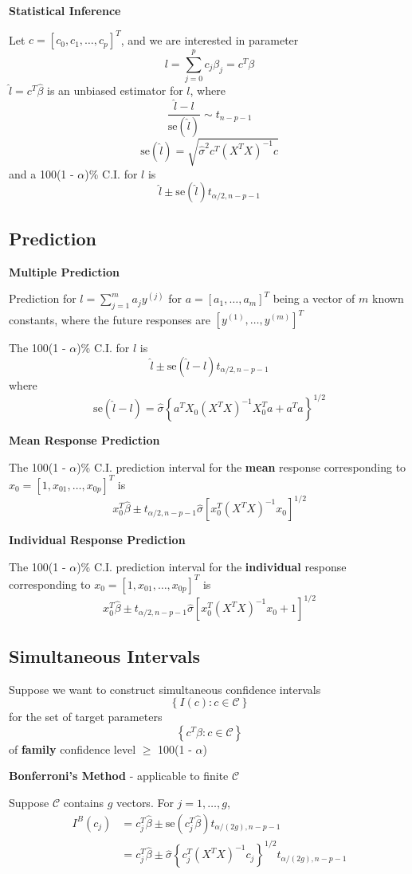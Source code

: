 \documentclass[11pt,a4paper]{article}
\begin{document}
\textbf{Statistical Inference} \par
Let $c = \left[c_0, c_1, \dots, c_p\right]^T$, and we are interested in parameter 
\[
l = \sum_{j=0}^{p} c_j \beta_j = c^T \beta
\]
$\hat{l} = c^T \hat{\beta}$ is an unbiased estimator for $l$, where
\[
\frac{\hat{l} - l}{\text{se}(\hat{l})} \sim t_{n-p-1}
\]
\[
\text{se}(\hat{l}) = \sqrt{\hat{\sigma}^2 c^T (X^TX)^{-1} c}
\]
and a 100(1 - $\alpha$)\% C.I. for $l$ is
\[
\hat{l} \pm \text{se}(\hat{l}) t_{\alpha/2, n-p-1}
\]

\subsection{Prediction}
\textbf{Multiple Prediction} \par
Prediction for $l = \sum_{j=1}^m a_j y^{(j)}$ for $a = \left[a_1, \dots, a_m \right]^T$ being a vector of $m$ known constants, where the future responses are $\left[y^{(1)}, \dots, y^{(m)}\right]^T$ \par
The 100(1 - $\alpha$)\% C.I. for $l$ is
\[
\hat{l} \pm \text{se}(\hat{l} - l) t_{\alpha/2, n-p-1}
\]
where
\[
\text{se}(\hat{l} - l) = \hat{\sigma} \left\{a^T X_0 (X^T X)^{-1} X_0^T a + a^T a\right\}^{1/2}
\]

\textbf{Mean Response Prediction} \par
The 100(1 - $\alpha$)\% C.I. prediction interval for the \textbf{mean} response corresponding to $x_0 = \left[1, x_{01}, \dots, x_{0p}\right]^T$ is
\[
x_0^T \hat{\beta} \pm t_{\alpha/2, n-p-1} \hat{\sigma} \left[x_0^T (X^TX)^{-1} x_0\right]^{1/2}
\]

\textbf{Individual Response Prediction} \par
The 100(1 - $\alpha$)\% C.I. prediction interval for the \textbf{individual} response corresponding to $x_0 = \left[1, x_{01}, \dots, x_{0p}\right]^T$ is
\[
x_0^T \hat{\beta} \pm t_{\alpha/2, n-p-1} \hat{\sigma} \left[x_0^T (X^TX)^{-1} x_0 + 1\right]^{1/2}
\]

\subsection{Simultaneous Intervals}
Suppose we want to construct simultaneous confidence intervals
\[
\left\{I(c): c \in \mathcal{C}\right\} 
\]
for the set of target parameters
\[
\left\{c^T\beta: c \in \mathcal{C}\right\} 
\]
of \textbf{family} confidence level $\geqslant$ 100(1 - $\alpha$) \par

\textbf{Bonferroni's Method} - applicable to finite $\mathcal{C}$ \par
Suppose $\mathcal{C}$ contains $g$ vectors. For $j = 1, \dots, g$,
\begin{align*}
I^B(c_j)    &= c_j^T \hat{\beta} \pm \text{se}(c_j^T \hat{\beta}) t_{\alpha/(2g), n-p-1} \\
            &= c_j^T \hat{\beta} \pm \hat{\sigma} \left\{c_j^T (X^TX)^{-1} c_j\right\}^{1/2} t_{\alpha/(2g), n-p-1} \\
\end{align*}
\end{document}

